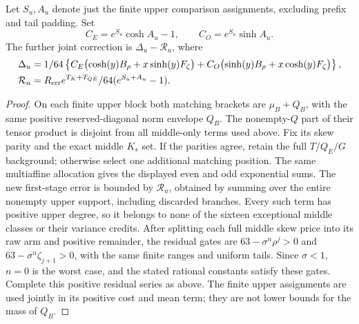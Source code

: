 \begin{proposition}\label{prop:joint-upper-mean}
Let $S_u,A_u$ denote just the finite upper comparison assignments,
excluding prefix and tail padding. Set
\[
 C_E=e^{S_u}\cosh A_u-1,\qquad C_O=e^{S_u}\sinh A_u.
\]
The further joint correction is $\Delta_u-\mathcal R_u$, where
\begin{align*}
 \Delta_u={}&\frac1{64}\left\{
 C_E\bigl(\cosh(y)B_\rho+x\sinh(y)F_\zeta\bigr)
 +C_O\bigl(\sinh(y)B_\rho+x\cosh(y)F_\zeta\bigr)\right\},\\
 \mathcal R_u={}&\frac{R_{\rm err}e^{T_K+T_{QE}}}{64}
                   (e^{S_u+A_u}-1).
\end{align*}
\end{proposition}

\begin{proof}
On each finite upper block both matching brackets are $\mu_B+Q_B$,
with the same positive reserved-diagonal norm envelope $Q_B$.
The nonempty-$Q$ part of their tensor product is disjoint from all
middle-only terms used above. Fix its skew parity and the exact middle
$K_s$ set. If the parities agree, retain the full $T/Q_E/G$ background;
otherwise select one additional matching position. The same multiaffine
allocation gives the displayed even and odd exponential sums.
The new first-stage error is bounded by $\mathcal R_u$, obtained by
summing over the entire nonempty upper support, including discarded
branches. Every such term has positive upper degree, so it belongs to
none of the sixteen exceptional middle classes or their variance credits.
After splitting each full middle skew price into its raw arm and
positive remainder, the residual gates are
$63-\sigma^n\rho^j>0$ and $63-\sigma^n\zeta_{j+1}>0$, with the same
finite ranges and uniform tails. Since $\sigma<1$, $n=0$ is the worst
case, and the stated rational constants satisfy these gates.
Complete this positive residual series as above. The finite upper
assignments are used jointly in its positive cost and mean term;
they are not lower bounds for the mass of $Q_B$.
\end{proof}
